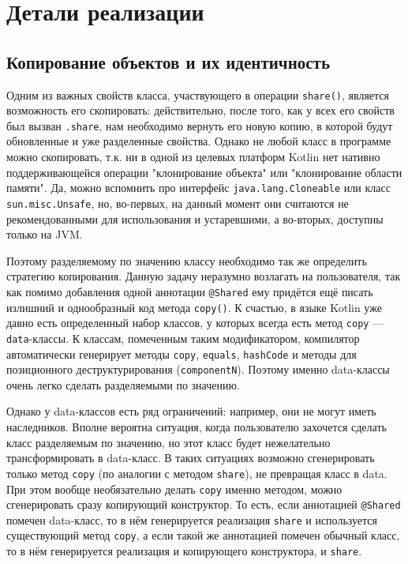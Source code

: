 \documentclass[specification,annotation,times]{itmo-student-thesis}
\newcommand{\todo}[1]{\textbf{TODO}} %
\begin{document}
\chapter{Детали реализации}



\section{Копирование объектов и их идентичность}

Одним из важных свойств класса, участвующего в операции \texttt{share()}, является возможность его скопировать: действительно, после того, как у всех его свойств был вызван \texttt{.share}, нам необходимо вернуть его новую копию, в которой будут обновленные и уже разделенные свойства.
Однако не любой класс в программе можно скопировать, т.к. ни в одной из целевых платформ Kotlin нет нативно поддерживающейся операции "клонирование объекта" или "клонирование области памяти". Да, можно вспомнить про интерфейс \texttt{java.lang.Cloneable} или класс \texttt{sun.misc.Unsafe}, но, во-первых, на данный момент они считаются не рекомендованными для использования и устаревшими, а во-вторых, доступны только на JVM.

Поэтому разделяемому по значению классу необходимо так же определить стратегию копирования. Данную задачу неразумно возлагать на пользователя, так как помимо добавления одной аннотации \texttt{@Shared} ему придётся ещё писать излишний и однообразный код метода \texttt{copy()}.
К счастью, в языке Kotlin уже давно есть определенный набор классов, у которых всегда есть метод \texttt{copy} --- \texttt{data}-классы. К классам, помеченным таким модификатором, компилятор автоматически генерирует методы \texttt{copy}, \texttt{equals}, \texttt{hashCode} и методы для позиционного деструктурирования (\texttt{componentN}).
Поэтому именно data-классы очень легко сделать разделяемыми по значению.

Однако у data-классов есть ряд ограничений: например, они не могут иметь наследников. Вполне вероятна ситуация, когда пользователю захочется сделать класс разделяемым по значению, но этот класс будет нежелательно трансформировать в data-класс.
В таких ситуациях возможно сгенерировать только метод \texttt{copy} (по аналогии с методом \texttt{share}), не превращая класс в data.
При этом вообще необязательно делать \texttt{copy} именно методом, можно сгенерировать сразу копирующий конструктор.
То есть, если аннотацией \texttt{@Shared} помечен data-класс, то в нём генерируется реализация \texttt{share} и используется существующий метод \texttt{copy}, а если такой же аннотацией помечен обычный класс, то в нём генерируется реализация и копирующего конструктора, и \texttt{share}.
\end{document}

